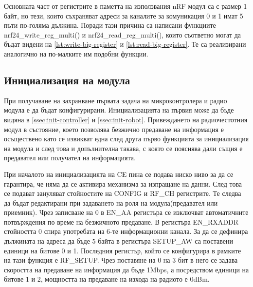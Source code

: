 Основната част от регистрите в паметта на използвания nRF модул са с размер 1 байт, но тези, които съхраняват адреси за каналите за комуникация 0 и 1 имат 5 пъти по-голяма дължина. Поради тази причина са написани функциите nrf24\_write\_reg\_multi() и nrf24\_read\_reg\_multi(), които съответно могат да бъдат видени на \autoref{lst:write-big-register} и \autoref{lst:read-big-register}. Те са реализирани аналогично на по-малките им подобни функции.







\subsection{Инициализация на модула}
\label{ssec:init}

При получаване на захранване първата задача на микроконтролера и радио модула е да бъдат конфигурирани. Инициализацията на първия може да бъде видяна в \cref{ssec:init-controller} и \cref{ssec:init-robot}. Привеждането на радиочестотния модул в състояние, което позволява безжично предаване на информация е осъществено като се извикват една след друга първо функцията за инициализация на модула и след това и допълнителна такава, с която се пояснява дали същия е предавател или получател на информацията.

При началото на инициализацията на CE пина се подава ниско ниво за да се гарантира, че няма да се активира механизма за изпращане на данни. След това се подават зануляват стойностите на CONFIG и RF\_CH регистрите. Те следва да бъдат редактирани при задаването на роля на модула(предавател или приемник). Чрез записване на 0 в EN\_AA регистъра се изключват автоматичните потвърждения по време на безжичното предаване. В регистъра EN\_RXADDR стойността 0 спира употребата на 6-те информационни канала. За да се дефинира дължината на адреса да бъде 5 байта в регистъра SETUP\_AW са поставени единици на битове 0 и 1. Последния регистър, който се конфигурира в рамките на тази функция е RF\_SETUP. Чрез поставяне на 0 на 3 бит в него се задава скоростта на предаване на информация да бъде 1Mbps, а посредством единици на битове 1 и 2, мощността на предаване на изхода на радиото е 0dBm. 

